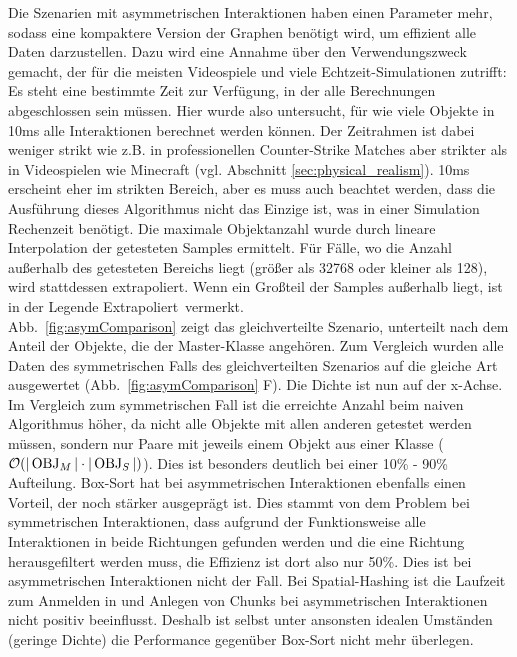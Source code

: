 Die Szenarien mit asymmetrischen Interaktionen haben einen Parameter mehr, sodass eine kompaktere Version der Graphen benötigt wird, um effizient alle Daten darzustellen. Dazu wird eine Annahme über den Verwendungszweck gemacht, der für die meisten Videospiele und viele Echtzeit-Simulationen zutrifft: Es steht eine bestimmte Zeit zur Verfügung, in der alle Berechnungen abgeschlossen sein müssen. Hier wurde also untersucht, für wie viele Objekte in 10ms alle Interaktionen berechnet werden können. Der Zeitrahmen ist dabei weniger strikt wie z.B. in professionellen Counter-Strike Matches aber strikter als in Videospielen wie Minecraft (vgl. Abschnitt \ref{sec:physical_realism}). 10ms erscheint eher im strikten Bereich, aber es muss auch beachtet werden, dass die Ausführung dieses Algorithmus nicht das Einzige ist, was in einer Simulation Rechenzeit benötigt. Die maximale Objektanzahl wurde durch lineare Interpolation der getesteten Samples ermittelt. Für Fälle, wo die Anzahl außerhalb des getesteten Bereichs liegt (größer als 32768 oder kleiner als 128), wird stattdessen extrapoliert. Wenn ein Großteil der Samples außerhalb liegt, ist in der Legende \glqq Extrapoliert\grqq ~vermerkt.\\
Abb.~\ref{fig:asymComparison} zeigt das gleichverteilte Szenario, unterteilt nach dem Anteil der Objekte, die der Master-Klasse angehören. Zum Vergleich wurden alle Daten des symmetrischen Falls des gleichverteilten Szenarios auf die gleiche Art ausgewertet (Abb.~\ref{fig:asymComparison} F). Die Dichte ist nun auf der x-Achse. Im Vergleich zum symmetrischen Fall ist die erreichte Anzahl beim naiven Algorithmus höher, da nicht alle Objekte mit allen anderen getestet werden müssen, sondern nur Paare mit jeweils einem Objekt aus einer Klasse ($\mathcal{O}(|\operatorname{OBJ}_M|\cdot |\operatorname{OBJ}_S|)$). Dies ist besonders deutlich bei einer 10\% - 90\% Aufteilung. Box-Sort hat bei asymmetrischen Interaktionen ebenfalls einen Vorteil, der noch stärker ausgeprägt ist. Dies stammt von dem Problem bei symmetrischen Interaktionen, dass aufgrund der Funktionsweise alle Interaktionen in beide Richtungen gefunden werden und die eine Richtung herausgefiltert werden muss, die Effizienz ist dort also nur 50\%. Dies ist bei asymmetrischen Interaktionen nicht der Fall. Bei Spatial-Hashing ist die Laufzeit zum Anmelden in und Anlegen von Chunks bei asymmetrischen Interaktionen nicht positiv beeinflusst. Deshalb ist selbst unter ansonsten idealen Umständen (geringe Dichte) die Performance gegenüber Box-Sort nicht mehr überlegen.\\
